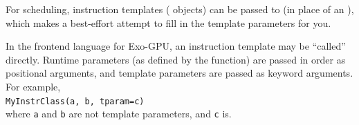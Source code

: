 For scheduling, instruction templates ( objects) can be passed to  (in place of an ), which makes a best-effort attempt to fill in the template parameters for you.

In the frontend language for Exo-GPU, an instruction template may be ``called'' directly.
Runtime parameters (as defined by the  function) are passed in order as positional arguments, and template parameters are passed as keyword arguments.
For example,\\
\texttt{MyInstrClass(a, b, tparam=c)}\\
where \texttt{a} and \texttt{b} are not template parameters, and \texttt{c} is.

